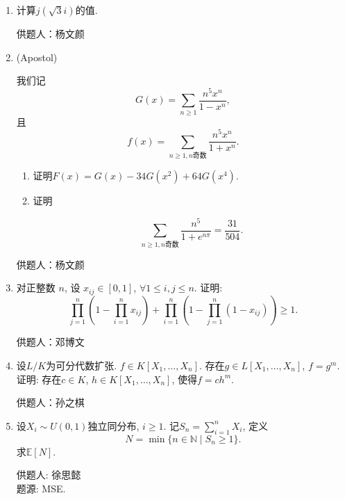 \documentclass[lang=cn,12pt,a4paper]{elegantpaper.cls}
\begin{document}
\begin{enumerate}
		\item 计算$j(\sqrt{3} i)$的值.
		\begin{flushright}
			\kaishu
			供题人：杨文颜
		\end{flushright}

\item(Apostol)

我们记
\[G(x)=\sum_{n\geq 1} \dfrac{n^5x^n}{1-x^n},\]
且
\[f(x)=\sum_{n\geq 1, n \textbf{奇数}}\dfrac{n^5x^n}{1+x^n}.\]

\begin{enumerate}
	\item 证明$F(x) = G(x)-34G(x^2)+64G(x^4).$
	
	\item 证明
	
	\[ \sum_{n\geq 1, n \textbf{奇数}} \dfrac{n^5}{1+e^{n\pi}} = \frac{31}{504}.\]
\end{enumerate}
\begin{flushright}
	\kaishu
	供题人：杨文颜
\end{flushright}
	
	
	
	
		\item 对正整数 $n$, 设 $x_{ij} \in [0,1]$, $\forall 1 \leq i,j \leq n$. 证明: \[\prod_{j=1}^{n}(1 - \prod_{i=1}^{n}x_{ij}) + \prod_{i=1}^{n}(1 - \prod_{j=1}^{n}(1 - x_{ij})) \geq 1.\]
		
		
		\begin{flushright}
			\kaishu
			供题人：邓博文
		\end{flushright}
		
		
			\item
			设$L/K$为可分代数扩张. $f\in K[X_1,\dots,X_n]$. 存在$g\in L[X_1,\dots,X_n]$, $f=g^m$. 证明: 存在$c\in K$, $h\in K[X_1,\dots,X_n]$, 使得$f=ch^m$.
			
		
		\begin{flushright}
			\kaishu
			供题人：孙之棋
		\end{flushright}
	

 
 
 \item 设$X_i\sim U(0,1)$独立同分布, $i\geq 1$. 记$S_n=\sum_{i=1}^{n}X_i$, 定义
 \begin{equation*}
 	N=\min\{n\in\mathbb{N}\mid S_n\geq 1\}.
 \end{equation*}
 求$\mathbb{E}[N]$.
 \begin{flushright}
 	\kaishu
 	供题人: 徐思懿\\
 	题源: MSE.
 \end{flushright}
\end{enumerate}
\end{document}
